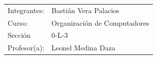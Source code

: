 \documentclass[12pt,letterpaper]{article}
\begin{document}
	\vspace*{6.25cm}
	\begin{flushright}
		\begin{tabular}[t]{l l}
			Integrantes: &Bastián Vera Palacios\\
			Curso: &Organización de Computadores\\
			Sección &0-L-3\\
			Profesor(a): &Leonel Medina Daza

		\end{tabular}
	\end{flushright}
	\begin{center}
		\vspace{1.5cm}
		\Today
	\end{center}

\newpage
\tableofcontents
\thispagestyle{empty}

\newpage
\renewcommand{\thepage}{\arabic{page}}
\setcounter{page}{1}







\clearpage
{}


\end{document}
